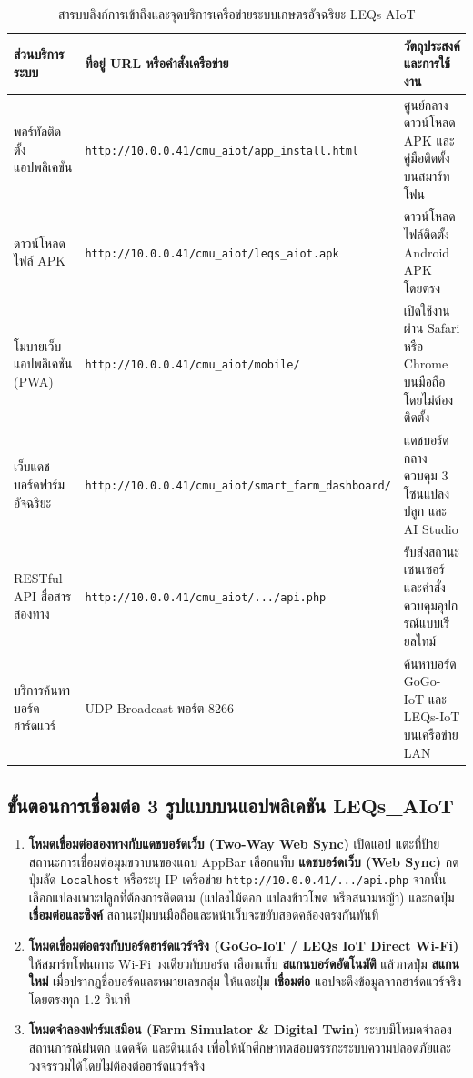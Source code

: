 \begin{table}[H]
\centering
\caption{สารบบลิงก์การเข้าถึงและจุดบริการเครือข่ายระบบเกษตรอัจฉริยะ LEQs AIoT}
\label{tab:system_endpoints_directory}
\begin{tabularx}{\textwidth}{p{3.4cm}p{5.2cm}Y}
\toprule
\textbf{ส่วนบริการระบบ} & \textbf{ที่อยู่ URL หรือคำสั่งเครือข่าย} & \textbf{วัตถุประสงค์และการใช้งาน} \\
\midrule
พอร์ทัลติดตั้งแอปพลิเคชัน & \texttt{http://10.0.0.41/cmu\_aiot/app\_install.html} & ศูนย์กลางดาวน์โหลด APK และคู่มือติดตั้งบนสมาร์ทโฟน \\
ดาวน์โหลดไฟล์ APK & \texttt{http://10.0.0.41/cmu\_aiot/leqs\_aiot.apk} & ดาวน์โหลดไฟล์ติดตั้ง Android APK โดยตรง \\
โมบายเว็บแอปพลิเคชัน (PWA) & \texttt{http://10.0.0.41/cmu\_aiot/mobile/} & เปิดใช้งานผ่าน Safari หรือ Chrome บนมือถือโดยไม่ต้องติดตั้ง \\
เว็บแดชบอร์ดฟาร์มอัจฉริยะ & \texttt{http://10.0.0.41/cmu\_aiot/smart\_farm\_dashboard/} & แดชบอร์ดกลางควบคุม 3 โซนแปลงปลูก และ AI Studio \\
RESTful API สื่อสารสองทาง & \texttt{http://10.0.0.41/cmu\_aiot/.../api.php} & รับส่งสถานะเซนเซอร์และคำสั่งควบคุมอุปกรณ์แบบเรียลไทม์ \\
บริการค้นหาบอร์ดฮาร์ดแวร์ & UDP Broadcast พอร์ต 8266 & ค้นหาบอร์ด GoGo-IoT และ LEQs-IoT บนเครือข่าย LAN \\
\bottomrule
\end{tabularx}
\end{table}

\subsection{ขั้นตอนการเชื่อมต่อ 3 รูปแบบบนแอปพลิเคชัน LEQs\_AIoT}
\begin{enumerate}
    \item \textbf{โหมดเชื่อมต่อสองทางกับแดชบอร์ดเว็บ (Two-Way Web Sync)}  เปิดแอป แตะที่ป้ายสถานะการเชื่อมต่อมุมขวาบนของแถบ AppBar เลือกแท็บ \textbf{แดชบอร์ดเว็บ (Web Sync)} กดปุ่มลัด \texttt{Localhost} หรือระบุ IP เครือข่าย \texttt{http://10.0.0.41/.../api.php} จากนั้นเลือกแปลงเพาะปลูกที่ต้องการติดตาม (แปลงไม้ดอก แปลงข้าวโพด หรือสนามหญ้า) และกดปุ่ม \textbf{เชื่อมต่อและซิงค์} สถานะปุ่มบนมือถือและหน้าเว็บจะขยับสอดคล้องตรงกันทันที
    \item \textbf{โหมดเชื่อมต่อตรงกับบอร์ดฮาร์ดแวร์จริง (GoGo-IoT / LEQs IoT Direct Wi-Fi)}  ให้สมาร์ทโฟนเกาะ Wi-Fi วงเดียวกับบอร์ด เลือกแท็บ \textbf{สแกนบอร์ดอัตโนมัติ} แล้วกดปุ่ม \textbf{สแกนใหม่} เมื่อปรากฏชื่อบอร์ดและหมายเลขกลุ่ม ให้แตะปุ่ม \textbf{เชื่อมต่อ} แอปจะดึงข้อมูลจากฮาร์ดแวร์จริงโดยตรงทุก 1.2 วินาที
    \item \textbf{โหมดจำลองฟาร์มเสมือน (Farm Simulator \& Digital Twin)}  ระบบมีโหมดจำลองสถานการณ์ฝนตก แดดจัด และดินแล้ง เพื่อให้นักศึกษาทดสอบตรรกะระบบความปลอดภัยและวงจรรวมได้โดยไม่ต้องต่อฮาร์ดแวร์จริง
\end{enumerate}

